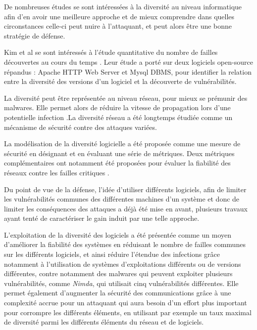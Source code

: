 De nombreuses études se sont intéressées à la diversité au niveau informatique afin d'en avoir une meilleure approche et de mieux comprendre dans quelles circonstances celle-ci peut nuire à l’attaquant, et peut alors être une bonne stratégie de défense.

Kim et al se sont intéressés à l’étude quantitative du nombre de failles découvertes au cours du temps \cite{vulnerabilityDiscovery}. Leur étude a porté sur deux logiciels open-source répandus : Apache HTTP Web Server et Mysql DBMS, pour identifier la relation entre la diversité des versions d’un logiciel et la découverte de vulnérabilités.

La diversité peut être représentée au niveau réseau, pour mieux se prémunir des malwares. Elle permet alors de réduire la vitesse de propagation lors d’une potentielle infection \cite{OptimisingNetwork}.La diversité réseau a été longtemps étudiée comme un mécanisme de sécurité contre des attaques variées.

La modélisation de la diversité logicielle a été proposée comme une mesure de sécurité en désignant et en évaluant une série de métriques. Deux métriques complémentaires ont notamment été proposées pour évaluer la fiabilité des réseaux contre les failles critiques \cite{networkDiversity}.

Du point de vue de la défense, l'idée d'utiliser différents logiciels, afin de limiter les vulnérabilités communes des différentes machines d’un système et donc de limiter les conséquences des attaques a déjà été mise en avant, plusieurs travaux ayant tenté de caractériser le gain induit par une telle approche\cite{softwareDiversity:Security}.

L'exploitation de la diversité des logiciels a été présentée comme un moyen d'améliorer la fiabilité des systèmes en réduisant le
nombre de failles communes sur les différents logiciels, et ainsi réduire l’étendue des infections grâce notamment à l’utilisation de systèmes d'exploitations différents ou de versions différentes,\cite{softwareDiversityPracticalStatistics}
contre notamment des malwares qui peuvent exploiter plusieurs vulnérabilités, comme \textit{Nimda}, qui utilisait cinq vulnérabilités différentes. 
Elle permet également d'augmenter la sécurité des communications grâce à une complexité accrue pour un attaquant qui aura besoin d’un effort plus important pour corrompre les différents éléments, en utilisant par exemple un taux maximal de diversité\cite{maximalRatio} parmi les différents éléments du réseau et de logiciels. 


